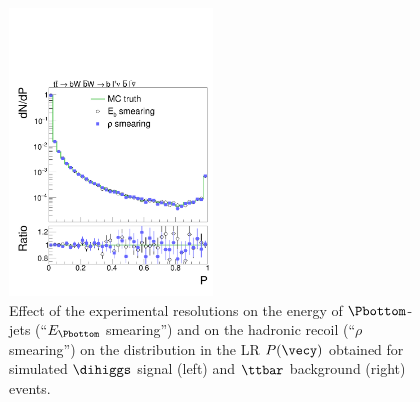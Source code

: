 \begin{figure}
\includegraphics[width=0.48\textwidth]{plots/hh_bbwwMEM_dilepton_effectOfSmearing_memLR_background.pdf}
\fi
\caption{
  Effect of the experimental resolutions on the energy of $\Pbottom$-jets (``$E_{\Pbottom}$ smearing'') and on the hadronic recoil (``$\rho$ smearing'') 
  on the distribution in the LR $P(\vecy)$ obtained for simulated $\dihiggs$ signal (left) and $\ttbar$ background (right) events.
}
\label{fig:memLR_smeared}
\end{figure}

